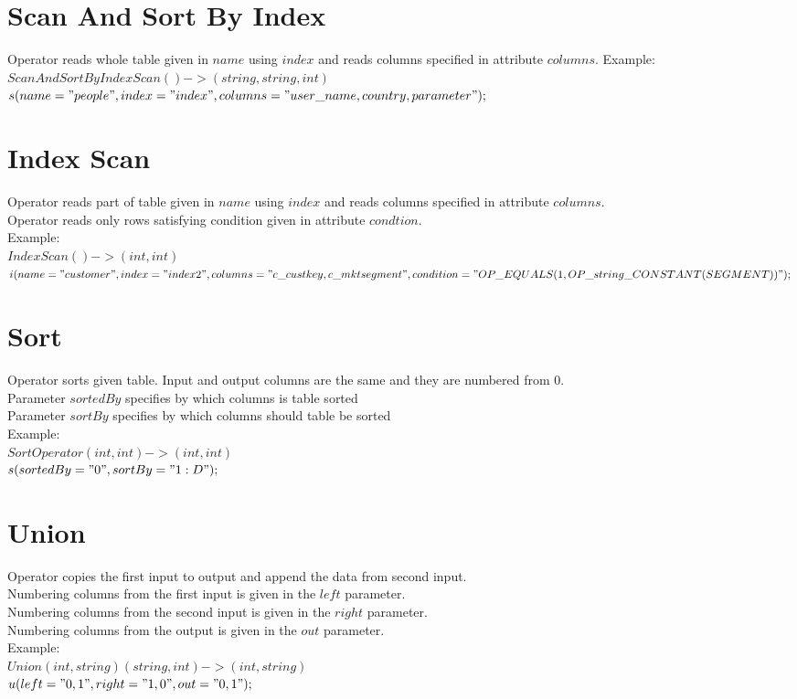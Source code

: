 \documentclass{article}
\begin{document}
\section{Scan And Sort By Index}
Operator reads whole table given in $name$ using $index$ and reads columns specified in attribute $columns$.
Example:\\
$ScanAndSortByIndexScan()->(string,string,int)$\\
$s(name="people",index="index",columns="user\_name,country,parameter"); $\\ 


\section{Index Scan}
Operator reads part of table given in $name$ using $index$ and reads columns specified in attribute $columns$.\\
Operator reads only rows satisfying condition given in attribute $condtion$.\\
Example:\\
$IndexScan()->(int,int)$\\
$i(name="customer",index="index2",columns="c\_custkey,c\_mktsegment",condition="OP\_EQUALS(1,OP\_string\_CONSTANT(SEGMENT))");$\\



\section{Sort}
Operator sorts given table.
Input and output columns are the same and they are numbered from 0.\\
Parameter $sortedBy$ specifies by which columns is table sorted\\
Parameter $sortBy$ specifies by which columns should table be sorted\\
Example:\\
$SortOperator(int,int)->(int,int)$\\
$s(sortedBy="0",sortBy="1:D");$\\


\section{Union}
Operator copies the first input to output and append the data from second input.\\
Numbering columns from the first input is given in the $left$ parameter.\\
Numbering columns from the second input is given in the $right$ parameter.\\
Numbering columns from the output is given in the $out$ parameter.\\
Example:\\
$Union(int,string)(string,int)->(int,string)$\\
$u(left="0,1",right="1,0",out="0,1");$\\
\end{document}
